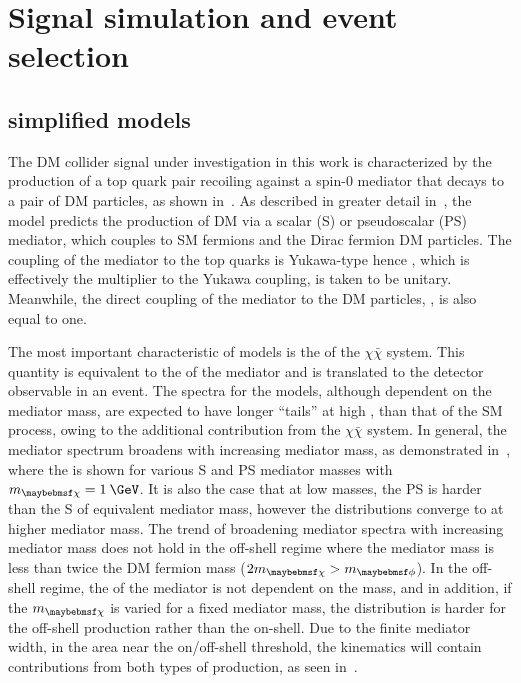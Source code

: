 \chapter{Signal simulation and event selection} 
\label{chap:signalsel}

\section{\ttDM simplified models}
\label{sec:simpmodels}

The DM collider signal under investigation in this work is characterized by the production of a top quark pair recoiling against a spin-0 mediator that decays to a pair of DM particles, as shown in~. As described in greater detail in~, the model predicts the production of DM via a scalar (S) or pseudoscalar (PS) mediator, which couples to SM fermions and the Dirac fermion DM particles. The coupling of the mediator to the top quarks is Yukawa-type hence \gq, which is effectively the multiplier to the Yukawa coupling, is taken to be unitary. Meanwhile, the direct coupling of the mediator to the DM particles, \gDM, is also equal to one.

The most important characteristic of \ttDM models is the \pt of the $\chi\bar{\chi}$ system. This quantity is equivalent to the \pt of the mediator and is translated to the \ptmiss detector observable in an event. The \ptmiss spectra for the \ttDM models, although dependent on the mediator mass, are expected to have longer ``tails'' at high \MET, than that of the SM \ttbar process, owing to the additional contribution from the $\chi\bar{\chi}$ system. In general, the mediator \pt spectrum broadens with increasing mediator mass, as demonstrated in~, where the \pt is shown for various S and PS mediator masses with $\mDM=1\:\GeV$. It is also the case that at low masses, the PS \pt is harder than the S \pt of equivalent mediator mass, however the distributions converge to at higher mediator mass. The trend of broadening mediator \pt spectra with increasing mediator mass does not hold in the off-shell regime where the mediator mass is less than twice the DM fermion mass ($2\mDM > \mMed$). In the off-shell regime, the \pt of the mediator is not dependent on the mass, and in addition, if the $\mDM$ is varied for a fixed mediator mass, the \pt distribution is harder for the off-shell production rather than the on-shell. Due to the finite mediator width, in the area near the on/off-shell threshold, the kinematics will contain contributions from both types of production, as seen in~. 

